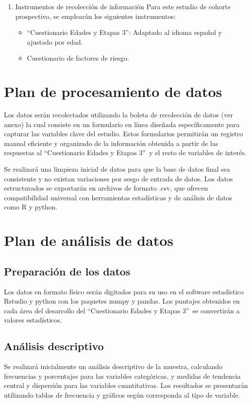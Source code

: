 \documentclass[11pt,letterpaper]{report}
\newcommand{\asq}{“Cuestionario Edades y Etapas 3”}
\begin{document}
\begin{enumerate}
\begin{enumerate}
\begin{itemize}
			sugiriendo la necesidad de intervención especializada.
			\end{itemize}
		Se analizarán las asociaciones entre los factores de exposición
		identificados y los resultados de neurodesarrollo en la evaluación.
	\end{enumerate}
	\item Instrumentos de recolección de información
	Para este estudio de cohorte prospectivo, se emplearán los siguientes
	instrumentos:
		\begin{itemize}
		\item \asq: Adaptado al idioma español y ajustado por edad.	
		\item Cuestionario de factores de riesgo.
		\end{itemize}
	\end{enumerate}

\section{Plan de procesamiento de datos}
Los datos serán recolectados utilizando la boleta de recolección de datos (ver
anexo) la cual consiste en un formulario en línea diseñada específicamente para
capturar las variables clave del estudio. Estos formularios permitirán un
registro manual eficiente y organizado de la información obtenida a partir de
las respuestas al \asq\ y el resto de variables de interés.

Se realizará una limpieza inicial de datos para que la base de datos final sea
consistente y no existan variaciones por sesgo de entrada de datos. Los datos
estructurados se exportarán en archivos de formato .csv, que ofrecen
compatibilidad universal con herramientas estadísticas y de análisis de datos
como R y python.

\section{Plan de análisis de datos}
\subsection{Preparación de los datos}
Los datos en formato físico serán digitados para su uso en el software
estadístico Rstudio y python con los paquetes numpy y pandas. Los puntajes
obtenidos en cada área del desarrollo del \asq\ se convertirán a valores
estadísticos. 
	
\subsection{Análisis descriptivo}
Se realizará inicialmente un análisis descriptivo de la muestra, calculando
frecuencias y porcentajes para las variables categóricas, y medidas de
tendencia central y dispersión para las variables cuantitativas. Los resultados
se presentarán utilizando tablas de frecuencia y gráficos según corresponda al
tipo de variable.
\end{document}
